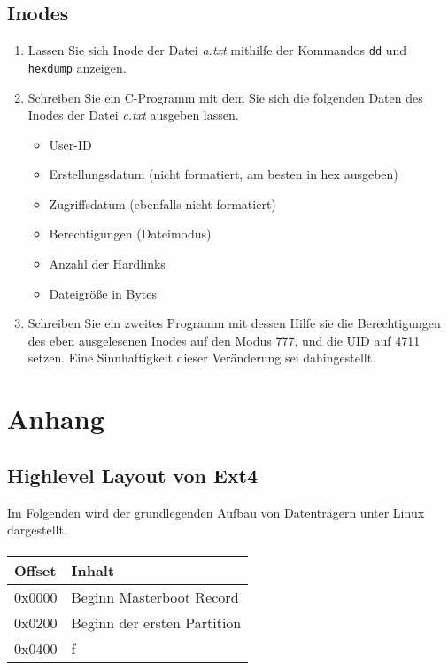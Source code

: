 \documentclass[11pt,a4paper]{article}
\def\inlinebash{\lstinline[style=bash]}
\begin{document}
\subsection{Inodes}
\begin{enumerate}
	\item Lassen Sie sich Inode der Datei \emph{a.txt} mithilfe der Kommandos \inlinebash$dd$
		und \inlinebash$hexdump$ anzeigen.
	\item Schreiben Sie ein C-Programm mit dem Sie sich die folgenden Daten
		des Inodes der Datei \emph{c.txt} ausgeben lassen.
		\begin{itemize}
			\item User-ID
			\item Erstellungsdatum (nicht formatiert, am besten in hex ausgeben)
			\item Zugriffsdatum (ebenfalls nicht formatiert)
			\item Berechtigungen (Dateimodus)
			\item Anzahl der Hardlinks
			\item Dateigröße in Bytes
		\end{itemize}
		
	\item Schreiben Sie ein zweites Programm mit dessen Hilfe sie die 
		Berechtigungen des eben ausgelesenen Inodes auf den Modus 777, 
		und die UID auf 4711 setzen.
		Eine Sinnhaftigkeit dieser Veränderung sei dahingestellt.
\end{enumerate}

\section{Anhang}
\subsection{Highlevel Layout von Ext4}
Im Folgenden wird der grundlegenden Aufbau von Datenträgern unter Linux dargestellt.
\paragraph{}

\begin{tabular}[c]{  l | l }
	\cellcolor{grey} Offset & \cellcolor{grey} Inhalt \\ \hline
	0x0000 & Beginn Masterboot Record \\
	0x0200 & Beginn der ersten Partition \\
	0x0400 & f \\

\end{tabular}
\end{document}
